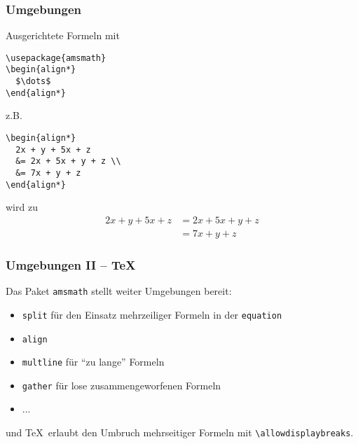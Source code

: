 \begin{frame}[fragile]
  \frametitle{Umgebungen}

  \onslide<+->

  Ausgerichtete Formeln mit
\begin{lstlisting}
\usepackage{amsmath}
\begin{align*}
  $\dots$
\end{align*}
\end{lstlisting}

  \onslide<+->

  z.B.

\begin{lstlisting}
\begin{align*}
  2x + y + 5x + z
  &= 2x + 5x + y + z \\
  &= 7x + y + z
\end{align*}
\end{lstlisting}

  wird zu\vspace*{-\baselineskip}
  \begin{align*}
    2x + y + 5x + z &= 2x + 5x + y + z \\
                    &= 7 x + y + z
  \end{align*}

\end{frame}

\begin{frame}[fragile]
  \frametitle{Umgebungen II -- \AmS\TeX}

  \onslide<+->

  Das Paket \texttt{amsmath} stellt weiter Umgebungen bereit:
  \begin{itemize}
  \item \texttt{split} für den Einsatz mehrzeiliger Formeln in der \texttt{equation}
  \item \texttt{align}
  \item \texttt{multline} für \enquote{zu lange} Formeln
  \item \texttt{gather} für lose zusammengeworfenen Formeln
  \item ...
  \end{itemize}

  und \AmS\TeX\ erlaubt den Umbruch mehrseitiger Formeln mit \lstinline!\allowdisplaybreaks!.

\end{frame}

